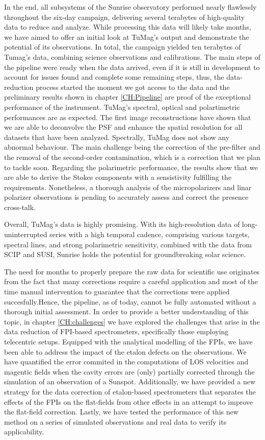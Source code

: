 In the end, all subsystems of the Sunrise observatory performed nearly flawlessly throughout the six-day campaign, delivering several terabytes of high-quality data to reduce and analyze. While processing this data will likely take months, we have aimed to offer an initial look at TuMag’s output and demonstrate the potential of its observations. In total, the campaign yielded ten terabytes of Tumag's data, combining science observations and calibrations. The main steps of the pipeline were ready when the data arrived, even if it is still in development to account for issues found and complete some remaining steps, thus, the data-reduction process started the moment we got access to the data and the preliminary results shown in chapter \ref{CH:Pipeline} are proof of the exceptional performance of the instrument. TuMag's spectral, optical and polartimetric performances are as expected. The first image reconstructions have shown that we are able to deconvolve the PSF and enhance the spatial resolution for all datasets that have been analyzed. Spectrally, TuMag does not show any abnormal behaviour. The main challenge being the correction of the pre-filter and the removal of the second-order contamination, which is a correction that we plan to tackle soon. Regarding the polarimetric performance, the results show that we are able to derive the Stokes components with a sensistivity fulfilling the requirements. Nonetheless, a thorough analysis of the micropolarizers and linar polarizer observations is pending to accurately assess and correct the presence cross-talk.

Overall, TuMag’s data is highly promising. With its high-resolution data of long-uninterrupted series with a high temporal cadence, comprising various targets, spectral lines, and strong polarimetric sensitivity, combined with the data from SCIP and SUSI, Sunrise holds the potential for groundbreaking solar science. 

The need for months to properly prepare the raw data for scientific use originates from the fact that many corrections require a careful application and most of the time manual intervention to guarantee that the corrections were applied succesfully.Hence, the pipeline, as of today, cannot be fully automated without a thorough initial assessment. In order to provide a better understanding of this topic, in chapter \ref{CH:challenges} we have explored the challenges that arise in the data reduction of FPI-based spectrometers, specifically those employing telecentric setups. Equipped with the analytical modelling of the FPIs, we have been able to address the impact of the etalon defects on the observations. We have quantified the error commited in the computations of LOS velocities and magentic fields when the cavity errors are (only) partially corrected through the simulation of an observation of a Sunspot. Additionally, we have provided a new strategy for the data correction of etalon-based spectrometers that separates the effects of the FPIs on the flat-fields from other effects in an attempt to improve the flat-field correction. Lastly, we have tested the performance of this new method on a series of simulated observations and real data to verify its applicability. 

